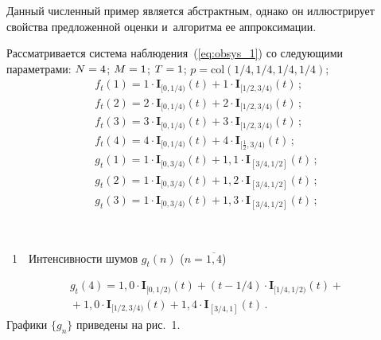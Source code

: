 \begin{multicols}{2}
  Данный численный пример является абстрактным, однако он иллюстрирует 
  свойства предложенной оценки и~алгоритма ее аппроксимации.

  Рассматривается система наблюдения~(\ref{eq:obsys_1}) со следующими параметрами:
 $N\hm=4$; $M\hm=1$; $T \hm= 1$; $p=\mathrm{col}({1}/{4},{1}/{4},{1}/{4},{1}/{4})$;
 \begin{equation*}
\begin{array}{l}
f_t(1) = 1\cdot\mathbf{I}_{[0,{1}/{4})}(t) +
1\cdot\mathbf{I}_{[{1}/{2},{3}/{4})}(t)\,;
\\[6pt]
f_t(2) = 2\cdot\mathbf{I}_{[0,{1}/{4})}(t) +
2\cdot\mathbf{I}_{[{1}/{2},{3}/{4})}(t)\,;
\\[6pt]
f_t(3) = 3\cdot\mathbf{I}_{[0,{1}/{4})}(t) +
3\cdot\mathbf{I}_{[{1}/{2},{3}/{4})}(t)\,;
\\[6pt]
f_t(4) = 4\cdot\mathbf{I}_{[0,{1}/{4})}(t) +
4\cdot\mathbf{I}_{[\frac{1}{2},{3}/{4})}(t)\,;\\[6pt]
g_t(1) = 1\cdot\mathbf{I}_{[0,{3}/{4})}(t) + 
1{,}1\cdot\mathbf{I}_{[{3}/{4},{1}/{2}]}(t)\,;
\\[6pt]
g_t(2) = 1\cdot\mathbf{I}_{[0,{3}/{4})}(t) + 1{,}2\cdot\mathbf{I}_{[{3}/{4},{1}/{2}]}
(t)\,; \\[6pt]
g_t(3) = 1\cdot\mathbf{I}_{[0,{3}/{4})}(t) + 1{,}3\cdot\mathbf{I}_{[{3}/{4},{1}/{2}]}(t)\,;
\end{array}
\end{equation*}

 { \begin{center}  %
 \vspace*{1pt}
 \mbox{%
\epsfxsize=77.118mm
}


\vspace*{9pt}


\noindent
{{\figurename~1}\ \ \small{Интенсивности шумов $g_t(n)$ ($n=\overline{1,4}$)}}
\end{center}
}

\vspace*{6pt}

\addtocounter{figure}{1}


\noindent
\begin{multline*}
g_t(4) = 1{,}0\cdot\mathbf{I}_{[0,{1}/{2})}(t) + (t-{1}/{4})\cdot\mathbf{I}_{[{1}/{4},
{1}/{2})}(t) +{}\\
{}+
1{,}0\cdot\mathbf{I}_{[{1}/{2},{3}/{4})}(t)
+ 1{,}4\cdot\mathbf{I}_{[{3}/{4},1]}(t)\,.
\end{multline*}
Графики $\{g_n\}$ приведены на рис.~1.




\end{multicols}
